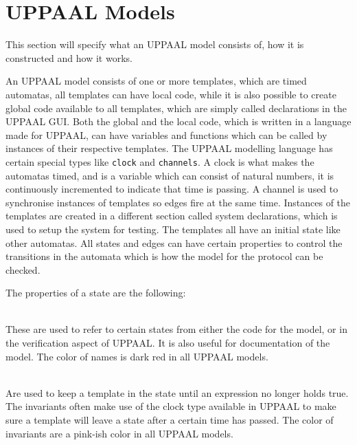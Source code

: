\section{UPPAAL Models}
This section will specify what an UPPAAL model consists of, how it is constructed and how it works.

An UPPAAL model consists of one or more templates, which are timed automatas, all templates can have local code, while it is also possible to create global code available to all templates, which are simply called declarations in the UPPAAL GUI.
Both the global and the local code, which is written in a language made for UPPAAL, can have variables and functions which can be called by instances of their respective templates.
The UPPAAL modelling language has certain special types like \texttt{clock} and \texttt{channels}.
A clock is what makes the automatas timed, and is a variable which can consist of natural numbers, it is continuously incremented to indicate that time is passing.
A channel is used to synchronise instances of templates so edges fire at the same time.
Instances of the templates are created in a different section called system declarations, which is used to setup the system for testing.
The templates all have an initial state like other automatas.
All states and edges can have certain properties to control the transitions in the automata which is how the model for the protocol can be checked.

\bigskip\noindent
The properties of a state are the following: 

\begin{description}[labelindent=\parindent]
    \item[Name]\hfill\\
    These are used to refer to certain states from either the code for the model, or in the verification aspect of UPPAAL. It is also useful for documentation of the model. The color of names is dark red in all UPPAAL models.
    \item[Invariants]\hfill\\
    Are used to keep a template in the state until an expression no longer holds true. The invariants often make use of the clock type available in UPPAAL to make sure a template will leave a state after a certain time has passed. The color of invariants are a pink-ish color in all UPPAAL models.
\end{description}


